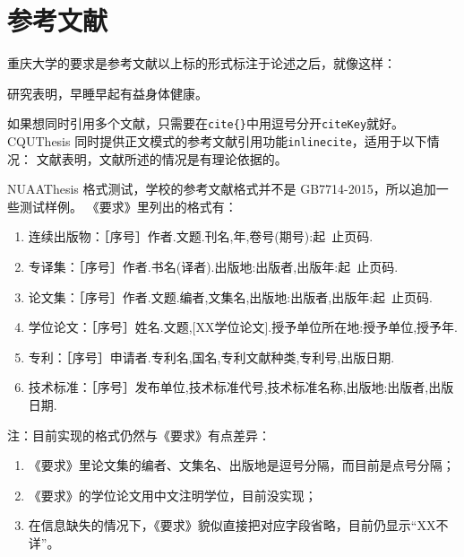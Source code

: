 \section{参考文献}
\label{sec:bib}
重庆大学的要求是参考文献以上标的形式标注于论述之后，就像这样：

研究表明\cite{r1}，早睡早起有益身体健康。

如果想同时引用多个文献\cite{r2,r3,r4,r6}，只需要在\verb|cite{}|中用逗号分开\texttt{citeKey}就好。
CQUThesis 同时提供正文模式的参考文献引用功能\texttt{inlinecite}，适用于以下情况：
文献表明，文献所述的情况是有理论依据的。

NUAAThesis 格式测试，学校的参考文献格式并不是 GB7714-2015，所以追加一些测试样例。
《要求》里列出的格式有：
\begin{enumerate}
  \item 连续出版物：［序号］作者.文题.刊名,年,卷号(期号):起~止页码.\cite{n11,n12}
  \item 专译集：［序号］作者.书名(译者).出版地:出版者,出版年:起~止页码.\cite{n21,n22}
  \item 论文集：［序号］作者.文题.编者,文集名,出版地:出版者,出版年:起~止页码.\cite{n31,n32}
  \item 学位论文：［序号］姓名.文题,[XX学位论文].授予单位所在地:授予单位,授予年.\cite{n41,n42,n43}
  \item 专利：［序号］申请者.专利名,国名,专利文献种类,专利号,出版日期.\cite{n51,n52,n53}
  \item 技术标准：［序号］发布单位,技术标准代号,技术标准名称,出版地:出版者,出版日期.\cite{n61,n62,n63}
\end{enumerate}

注：目前实现的格式仍然与《要求》有点差异：
\begin{enumerate}
  \item 《要求》里论文集的编者、文集名、出版地是逗号分隔，而目前是点号分隔；
  \item 《要求》的学位论文用中文注明学位，目前没实现；
  \item 在信息缺失的情况下，《要求》貌似直接把对应字段省略，目前仍显示“XX不详”。
\end{enumerate}
